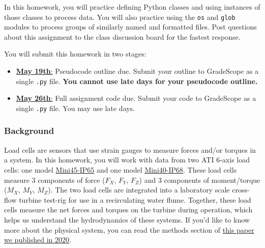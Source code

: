\documentclass{homework}
\begin{document}
\maketitle

In this homework, you will practice defining Python classes and using instances of those classes to process data. You will also practice using the \texttt{os} and \texttt{glob} modules to process groups of similarly named and formatted files. Post questions about this assignment to the class discussion board for the fastest response. 

You will submit this homework in two stages:
\begin{itemize}
    \itemsep0em 
    \item[] \underline{\textbf{May 19th}:} Pseudocode outline due. Submit your outline to GradeScope as a single \texttt{.py} file. \textbf{You cannot use late days for your pseudocode outline.}
    \item[] \underline{\textbf{May 26th}:} Full assignment code due. Submit your code to GradeScope as a single \texttt{.py} file. You may use late days.
\end{itemize}


\subsubsection*{Background}

Load cells are sensors that use strain gauges to measure forces and/or torques in a system. In this homework, you will work with data from two ATI 6-axis load cells: one model \href{https://www.ati-ia.com/products/ft/ft_models.aspx?id=Mini45+IP65%2FIP68}{Mini45-IP65} and one model \href{https://www.ati-ia.com/products/ft/ft_models.aspx?id=Mini40+IP65%2fIP68}{Mini40-IP68}. These load cells measure 3 components of force ($F_X$, $F_Y$, $F_Z$) and 3 components of moment/torque ($M_X$, $M_Y$, $M_Z$). The two load cells are integrated into a laboratory scale cross-flow turbine test-rig for use in a recirculating water flume. Together, these load cells measure the net forces and torques on the turbine during operation, which helps us understand the hydrodynamics of these systems. If you'd like to know more about the physical system, you can read the methods section of \href{https://pubs.aip.org/aip/jrse/article/12/5/054501/1060548/Effect-of-aspect-ratio-on-cross-flow-turbine}{this paper we published in 2020}.
\end{document}

